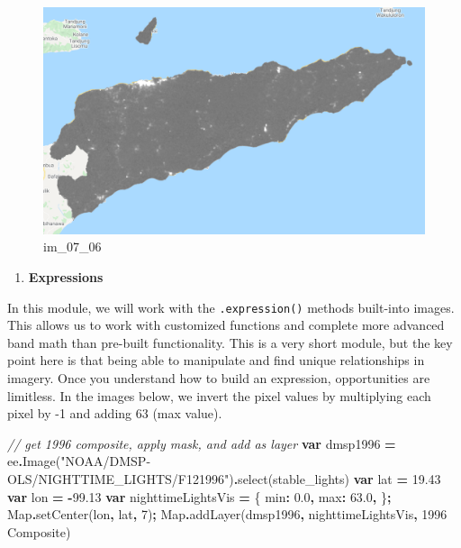 \documentclass[
]{article}
\newenvironment{Shaded}{\begin{snugshade}}{\end{snugshade}}
\newcommand{\BuiltInTok}[1]{#1}
\newcommand{\CommentTok}[1]{\textcolor[rgb]{0.56,0.35,0.01}{\textit{#1}}}
\newcommand{\DataTypeTok}[1]{\textcolor[rgb]{0.13,0.29,0.53}{#1}}
\newcommand{\DecValTok}[1]{\textcolor[rgb]{0.00,0.00,0.81}{#1}}
\newcommand{\FloatTok}[1]{\textcolor[rgb]{0.00,0.00,0.81}{#1}}
\newcommand{\FunctionTok}[1]{\textcolor[rgb]{0.00,0.00,0.00}{#1}}
\newcommand{\KeywordTok}[1]{\textcolor[rgb]{0.13,0.29,0.53}{\textbf{#1}}}
\newcommand{\NormalTok}[1]{#1}
\newcommand{\OperatorTok}[1]{\textcolor[rgb]{0.81,0.36,0.00}{\textbf{#1}}}
\newcommand{\StringTok}[1]{\textcolor[rgb]{0.31,0.60,0.02}{#1}}
\providecommand{\tightlist}{%
  \setlength{\itemsep}{0pt}\setlength{\parskip}{0pt}}
\begin{document}
\begin{figure}
\centering
\includegraphics{./im/im_07_06.png}
\caption{im\_07\_06}
\end{figure}

\begin{enumerate}
\def\labelenumi{\arabic{enumi}.}
\setcounter{enumi}{4}
\tightlist
\item
  \textbf{Expressions}
\end{enumerate}

In this module, we will work with the \texttt{.expression()} methods built-into images. This allows us to work with customized functions and complete more advanced band math than pre-built functionality. This is a very short module, but the key point here is that being able to manipulate and find unique relationships in imagery. Once you understand how to build an expression, opportunities are limitless. In the images below, we invert the pixel values by multiplying each pixel by -1 and adding 63 (max value).

\begin{Shaded}
\begin{Highlighting}[]
\CommentTok{// get 1996 composite, apply mask, and add as layer}
\KeywordTok{var}\NormalTok{ dmsp1996 }\OperatorTok{=}\NormalTok{ ee}\OperatorTok{.}\FunctionTok{Image}\NormalTok{(}\StringTok{"NOAA/DMSP{-}OLS/NIGHTTIME\_LIGHTS/F121996"}\NormalTok{)}\OperatorTok{.}\FunctionTok{select}\NormalTok{(}\StringTok{\textquotesingle{}stable\_lights\textquotesingle{}}\NormalTok{)}
\KeywordTok{var}\NormalTok{ lat }\OperatorTok{=} \FloatTok{19.43}
\KeywordTok{var}\NormalTok{ lon }\OperatorTok{=} \OperatorTok{{-}}\FloatTok{99.13}
\KeywordTok{var}\NormalTok{ nighttimeLightsVis }\OperatorTok{=}\NormalTok{ \{}
  \DataTypeTok{min}\OperatorTok{:} \FloatTok{0.0}\OperatorTok{,}
  \DataTypeTok{max}\OperatorTok{:} \FloatTok{63.0}\OperatorTok{,}
\NormalTok{\}}\OperatorTok{;}
\BuiltInTok{Map}\OperatorTok{.}\FunctionTok{setCenter}\NormalTok{(lon}\OperatorTok{,}\NormalTok{ lat}\OperatorTok{,} \DecValTok{7}\NormalTok{)}\OperatorTok{;}
\BuiltInTok{Map}\OperatorTok{.}\FunctionTok{addLayer}\NormalTok{(dmsp1996}\OperatorTok{,}\NormalTok{ nighttimeLightsVis}\OperatorTok{,} \StringTok{\textquotesingle{}1996 Composite\textquotesingle{}}\NormalTok{)}
\end{Highlighting}
\end{Shaded}
\end{document}
